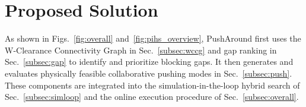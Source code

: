\section{Proposed Solution}\label{sec:solution}

As shown in Figs.~\ref{fig:overall} and~\ref{fig:pihs_overview}, PushAround first
uses the W-Clearance
Connectivity Graph in Sec.~\ref{subsec:wccg} and gap ranking in
Sec.~\ref{subsec:gap} to identify and prioritize blocking gaps. It then
generates and evaluates physically feasible collaborative pushing modes in
Sec.~\ref{subsec:push}. These components are integrated into the
simulation-in-the-loop hybrid search of Sec.~\ref{subsec:simloop} and the online
execution procedure of Sec.~\ref{subsec:overall}.










